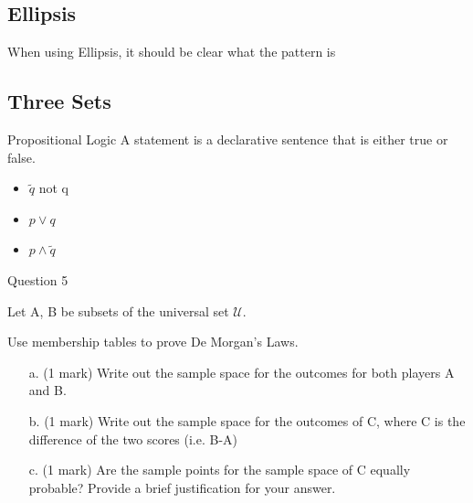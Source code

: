 \documentclass[]{report}
\begin{document}
\newpage



\subsection{Ellipsis}

When using Ellipsis, it should be clear what the pattern is













\subsection*{ Three Sets }






Propositional Logic A statement is a declarative sentence that
is either true or false.
\begin{itemize}
\item $\tilde q$ not q \item $p \vee q$ \item $p \wedge \tilde
q$
\end{itemize}




Question 5


Let A, B be subsets of the universal set $\mathcal{U}$.

Use membership tables to prove De Morgan's Laws.


%
%
%


\begin{itemize}
\item[a.] (1 mark) Write out the sample space for the outcomes for both players A and B.
\item[b.] (1 mark) Write out the sample space for the outcomes of C, where C is the difference of the two scores (i.e. B-A)
\item[c.] (1 mark) Are the sample points for the sample space of C equally probable? Provide a brief justification for your answer.
\end{itemize}
\end{document}
